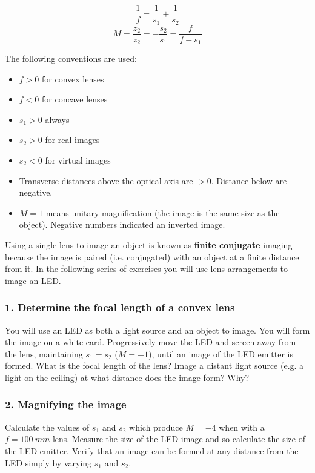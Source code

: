 \documentclass[a4paper]{report}
\begin{document}
\begin{equation}
\frac{1}{f}=\frac{1}{s_1}+\frac{1}{s_2}
\label{eq:thinlens}
\end{equation}
\begin{equation}
M=\frac{z_2}{z_2}=-\frac{s_2}{s_1}=\frac{f}{f-s_1}
\label{eq:mag}
\end{equation}

The following conventions are used:
\begin{itemize}
\item $f>0$ for convex lenses
\item $f<0$ for concave lenses
\item $s_1>0$ always
\item $s_2>0$ for real images
\item $s_2<0$ for virtual images
\item Transverse distances above the optical axis are $>0$. Distance
  below are negative. 
\item $M=1$ means unitary magnification (the image is the same size as
  the object). Negative numbers indicated an inverted image.
\end{itemize}

Using a single lens to image an object is known as \textbf{finite
  conjugate} imaging because the image is paired (i.e. conjugated)
with an object at a finite distance from it. In the following series
of exercises you will use lens arrangements to image an LED.

\subsubsection{1. Determine the focal length of a convex lens }
You will use an LED as both a light source and an object to image. You
will form the image on a white card. Progressively move the LED and
screen away from the lens, maintaining $s_1=s_2$ ($M=-1$), until an
image of the LED emitter is formed. What is the focal length of the
lens? Image a distant light source (e.g. a light on the ceiling) at
what distance does the image form? Why?

% 
\subsubsection{2. Magnifying the image}
Calculate the values of $s_1$ and $s_2$ which produce $M=-4$ when with
a $f=100~mm$ lens. Measure the size of the LED image and so calculate
the size of the LED emitter. Verify that an image can be formed at any
distance from the LED simply by varying $s_1$ and $s_2$. 
\end{document}

